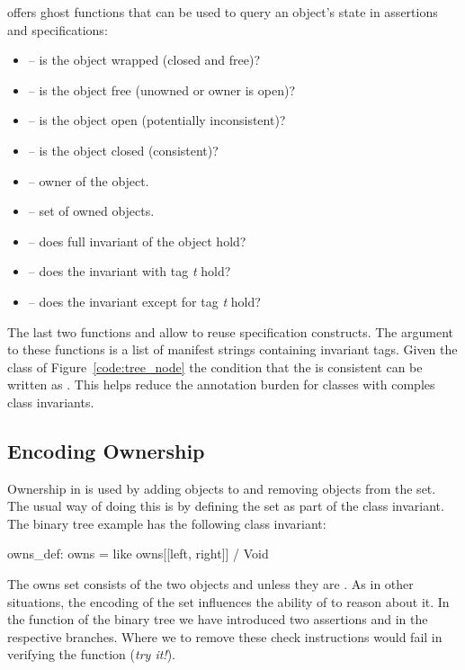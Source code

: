 \AutoProof offers ghost functions that can be used to query an object's state in assertions and specifications:

\begin{itemize}
\item {} -- is the object wrapped (closed and free)?
\item {} -- is the object free (unowned or owner is open)?
\item {}  -- is the object open (potentially inconsistent)?
\item {} -- is the object closed (consistent)?
\item {} -- owner of the object.
\item {} -- set of owned objects.
\item {} -- does full invariant of the object hold?
\item {} -- does the invariant with tag \emph{t} hold?
\item {} -- does the invariant except for tag \emph{t} hold?
\end{itemize}

The last two functions  and  allow to reuse specification constructs. The argument to these functions is a list of manifest strings containing invariant tags. Given the class of Figure~\ref{code:tree_node} the condition that the  is consistent can be written as . This helps reduce the annotation burden for classes with comples class invariants.


\subsection{Encoding Ownership}

Ownership in \AutoProof is used by adding objects to and removing objects from the  set. The usual way of doing this is by defining the  set as part of the class invariant. The binary tree example has the following class invariant:
\begin{erunning}[numbers=none]
owns_def: owns = {like owns}[[left, right]] / Void
\end{erunning}
The owns set consists of the two objects  and  unless they are . As in other situations, the encoding of the  set influences the ability of \AutoProof to reason about it. In the  function of the binary tree we have introduced two assertions  and  in the respective branches. Where we to remove these check instructions \AutoProof would fail in verifying the function (\emph{try it!}). 

